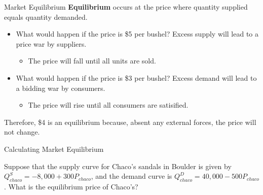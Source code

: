 \documentclass[12pt,t]{beamer}
\begin{document}
\begin{frame}{Market Equilibrium}
  \textbf{Equilibrium} occurs at the price where quantity supplied equals quantity demanded. 

  \begin{itemize}
    \item What would happen if the price is \$5 per bushel? Excess supply will lead to a price war by suppliers.
      \begin{itemize}
        \item The price will fall until all units are sold.
      \end{itemize}

    \item What would happen if the price is \$3 per bushel? Excess demand will lead to a bidding war by consumers.
      \begin{itemize}
        \item The price will rise until all consumers are satisified.
      \end{itemize}
  \end{itemize}


  \pause 
  Therefore, \$4 is an equilibrium because, absent any external forces, the price will not change.
\end{frame}

\begin{frame}{Calculating Market Equilibrium}

\bigskip
Suppose that the supply curve for Chaco's sandals in Boulder is given by $Q^S_{chaco} = -8,000 + 300P_{chaco}$, and the demand curve is $Q^D_{chaco} = 40,000  - 500P_{chaco}$. What is the equilibrium price of Chaco's?

\end{frame}
\end{document}
